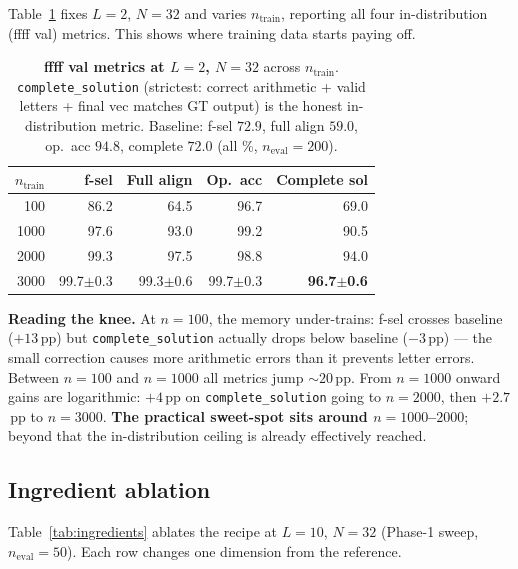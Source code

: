 \documentclass[10pt]{article}
\begin{document}
Table~\ref{tab:knee} fixes $L{=}2$, $N{=}32$ and varies $n_\text{train}$,
reporting all four in-distribution (ffff val) metrics. This shows where
training data starts paying off.

\begin{table}[ht]
  \centering\small
  \caption{\textbf{ffff val metrics at $L{=}2$, $N{=}32$} across
    $n_\text{train}$. \texttt{complete\_solution} (strictest: correct
    arithmetic + valid letters + final vec matches GT output) is the
    honest in-distribution metric. Baseline: f-sel $72.9$, full align
    $59.0$, op.\ acc $94.8$, complete $72.0$ (all \%, $n_\text{eval}{=}200$).}
  \label{tab:knee}
  \renewcommand{\arraystretch}{1.1}
  \begin{tabular}{rrrrr}
    \toprule
    $n_\text{train}$ & \textbf{f-sel} & \textbf{Full align} &
    \textbf{Op.\ acc} & \textbf{Complete sol} \\
    \midrule
    100   & 86.2 & 64.5 & 96.7 & \textcolor{bad}{69.0} \\
    1000  & 97.6 & 93.0 & 99.2 & 90.5 \\
    2000  & 99.3 & 97.5 & 98.8 & 94.0 \\
    3000  & 99.7$\pm$0.3 & 99.3$\pm$0.6 & 99.7$\pm$0.3 & \textbf{96.7$\pm$0.6} \\
    \bottomrule
  \end{tabular}
\end{table}

\textbf{Reading the knee.} At $n{=}100$, the memory under-trains: f-sel
crosses baseline ($+13$\,pp) but \texttt{complete\_solution} actually
drops below baseline ($-3$\,pp) — the small correction causes more
arithmetic errors than it prevents letter errors. Between $n{=}100$ and
$n{=}1000$ all metrics jump $\sim 20$\,pp. From $n{=}1000$ onward gains
are logarithmic: $+4$\,pp on \texttt{complete\_solution} going to
$n{=}2000$, then $+2.7$\,pp to $n{=}3000$. \textbf{The practical
sweet-spot sits around $n{=}1000$--$2000$}; beyond that the in-distribution
ceiling is already effectively reached.

\subsection{Ingredient ablation}

Table~\ref{tab:ingredients} ablates the recipe at $L{=}10$, $N{=}32$
(Phase-1 sweep, $n_\text{eval}{=}50$). Each row changes one dimension
from the reference.
\end{document}
